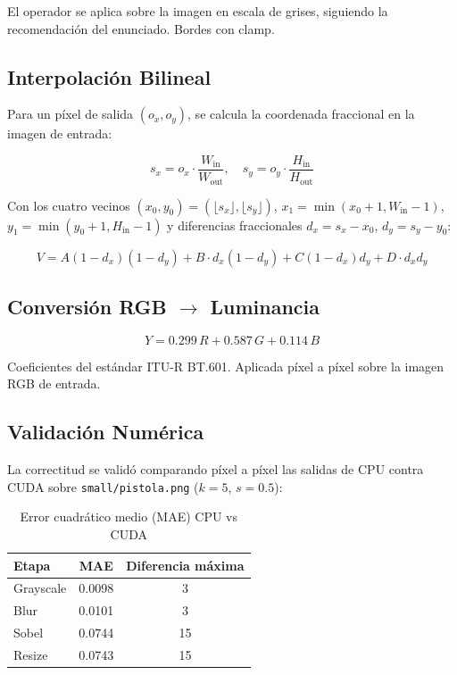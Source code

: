 \documentclass[12pt,a4paper]{article}
\begin{document}
El operador se aplica sobre la imagen en escala de grises, siguiendo la recomendaci\'on del enunciado. Bordes con clamp.

\subsection{Interpolaci\'on Bilineal}

Para un p\'ixel de salida $(o_x, o_y)$, se calcula la coordenada fraccional en la imagen de entrada:

\begin{equation}
s_x = o_x \cdot \frac{W_{\text{in}}}{W_{\text{out}}}, \quad s_y = o_y \cdot \frac{H_{\text{in}}}{H_{\text{out}}}
\end{equation}

Con los cuatro vecinos $(x_0,y_0) = (\lfloor s_x\rfloor, \lfloor s_y\rfloor)$, $x_1=\min(x_0+1, W_{\text{in}}-1)$, $y_1=\min(y_0+1, H_{\text{in}}-1)$ y diferencias fraccionales $d_x = s_x-x_0$, $d_y = s_y-y_0$:

\begin{equation}
V = A(1-d_x)(1-d_y) + B\cdot d_x(1-d_y) + C(1-d_x)d_y + D\cdot d_x d_y
\end{equation}

\subsection{Conversi\'on RGB $\rightarrow$ Luminancia}

\begin{equation}
Y = 0.299\,R + 0.587\,G + 0.114\,B
\end{equation}

Coeficientes del est\'andar ITU-R BT.601. Aplicada p\'ixel a p\'ixel sobre la imagen RGB de entrada.

\subsection{Validaci\'on Num\'erica}

La correctitud se valid\'o comparando p\'ixel a p\'ixel las salidas de CPU contra CUDA sobre \texttt{small/pistola.png} ($k=5$, $s=0.5$):

\begin{table}[H]
\centering
\caption{Error cuadr\'atico medio (MAE) CPU vs CUDA}
\begin{tabular}{lcc}
\toprule
\textbf{Etapa} & \textbf{MAE} & \textbf{Diferencia m\'axima} \\
\midrule
Grayscale & 0.0098 & 3 \\
Blur & 0.0101 & 3 \\
Sobel & 0.0744 & 15 \\
Resize & 0.0743 & 15 \\
\bottomrule
\end{tabular}
\end{table}
\end{document}
